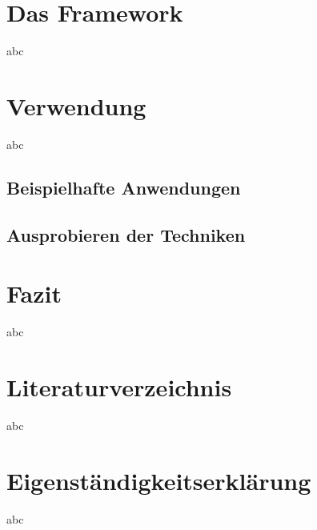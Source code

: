 \documentclass[a4paper,11pt]{scrartcl}
\begin{document}
\section{Das Framework}
abc

\section{Verwendung}
abc
\subsection{Beispielhafte Anwendungen}

\subsection{Ausprobieren der Techniken}

\section{Fazit}
abc

\section{Literaturverzeichnis}
abc

\section{Eigenständigkeitserklärung}
abc
\end{document}
